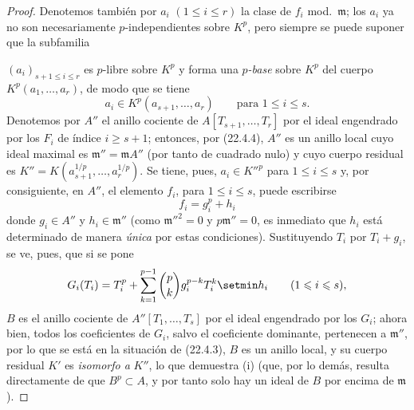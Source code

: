 \begin{proof}
Denotemos también por $a_i$ $(1\leqslant i\leqslant r)$ la clase de $f_i$
mod.~$\mathfrak m$; los $a_i$ ya no son necesariamente $p$-independientes
sobre $K^p$, pero siempre se puede suponer que la subfamilia


$(a_i)_{s+1\leqslant i\leqslant r}$ es $p$-libre sobre $K^p$ y forma una
\emph{$p$-base} sobre $K^p$ del cuerpo $K^p(a_1,\ldots,a_r)$, de modo que se tiene
\[
  a_i\in K^p(a_{s+1},\ldots,a_r)\qquad\text{para }1\leqslant i\leqslant s.
\]
Denotemos por $A''$ el anillo cociente de $A[T_{s+1},\ldots,T_r]$ por el ideal
engendrado por los $F_i$ de índice $i\geqslant s+1$; entonces, por (22.4.4), $A''$
es un anillo local cuyo ideal maximal es $\mathfrak m''=\mathfrak mA''$
(por tanto de cuadrado nulo) y cuyo cuerpo residual es
$K''=K(a_{s+1}^{1/p},\ldots,a_r^{1/p})$. Se tiene, pues,
$a_i\in K''^p$ para $1\leqslant i\leqslant s$ y, por consiguiente, en $A''$,
el elemento $f_i$, para $1\leqslant i\leqslant s$, puede escribirse
\begin{equation}
\label{0.22.4.7.3-fr}
  f_i=g_i^p+h_i
  \tag{22.4.7.3}
\end{equation}
donde $g_i\in A''$ y $h_i\in\mathfrak m''$ (como $\mathfrak m''^2=0$ y
$p\mathfrak m''=0$, es inmediato que $h_i$ está determinado de manera
\emph{única} por estas condiciones). Sustituyendo $T_i$ por $T_i+g_i$, se ve, pues,
que si se pone
\[
  G_i(T_i)=T_i^p+\sum_{k=1}^{p-1}\binom pk g_i^{p-k}T_i^k\setmin h_i
  \qquad(1\leqslant i\leqslant s),
\]
$B$ es el anillo cociente de $A''[T_1,\ldots,T_s]$ por el ideal engendrado por los
$G_i$; ahora bien, todos los coeficientes de $G_i$, salvo el coeficiente dominante,
pertenecen a $\mathfrak m''$, por lo que se está en la situación de (22.4.3),
$B$ es un anillo local, y su cuerpo residual $K'$ es \emph{isomorfo a}
$K''$, lo que demuestra (i) (que, por lo demás, resulta directamente de que
$B^p\subset A$, y por tanto solo hay un ideal de $B$ por encima de
$\mathfrak m$).


\end{proof}
